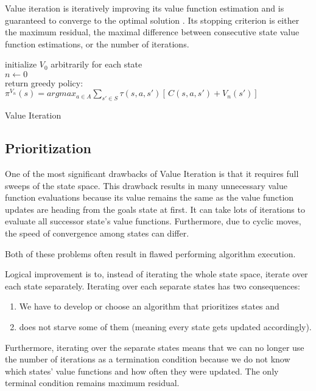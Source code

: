 Value iteration is iteratively improving its value function estimation and is guaranteed to converge to the optimal solution \cite{Kolobov2012}. Its stopping criterion is either the maximum residual, the maximal difference between consecutive state value function estimations, or the number of iterations.

\LinesNumbered
\begin{algorithm}
\SetAlgoLined
initialize $V_0$ arbitrarily for each state \\
$n \xleftarrow{} 0$ \\ 
return greedy policy: $\pi^{V_n} (s) = argmax_{a \in A} \sum_{s' \in S} \tau(s, a, s')[ \,C(s, a, s') + V_n (s')] \,$
\caption{Value Iteration}
\end{algorithm}


\subsection{Prioritization}
One of the most significant drawbacks of Value Iteration is that it requires full sweeps of the state space. This drawback results in many unnecessary value function evaluations because its value remains the same as the value function updates are heading from the goals state at first. It can take lots of iterations to evaluate all successor state's value functions. Furthermore, due to cyclic moves, the speed of convergence among states can differ.

Both of these problems often result in flawed performing algorithm execution.

Logical improvement is to, instead of iterating the whole state space, iterate over each state separately. Iterating over each separate states has two consequences:
\begin{enumerate}
    \item We have to develop or choose an algorithm that prioritizes states and 
    \item does not starve some of them (meaning every state gets updated accordingly).
\end{enumerate}

Furthermore, iterating over the separate states means that we can no longer use the number of iterations as a termination condition because we do not know which states' value functions and how often they were updated. The only terminal condition remains maximum residual.

